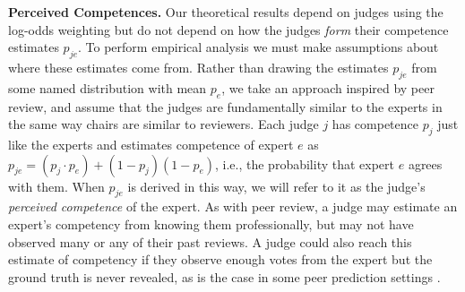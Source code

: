\documentclass[letterpaper]{article} %
\newcommand{\judge}{\ensuremath{j} }
\newcommand{\expert}{\ensuremath{e} }
\begin{document}
\smallskip
\noindent
\textbf{Perceived Competences.\;}%
Our theoretical results depend on judges using the log-odds weighting but do not depend on how the judges \emph{form} their competence estimates $p_{\judge \expert}$.
%
To perform empirical analysis we must make assumptions about where these estimates come from.
%
Rather than drawing the estimates $p_{\judge \expert}$ from some named distribution with mean $p_\expert$, we take an approach inspired by peer review, and assume that the judges are fundamentally similar to the experts in the same way chairs are similar to reviewers.
%
Each judge $j$ has competence $p_j$ just like the experts and estimates competence of expert $\expert$ as $p_{\judge \expert} = (p_\judge \cdot p_\expert) + (1 - p_\judge)(1 - p_\expert)$, i.e., the probability that expert $\expert$ agrees with them. 
%
When $p_{\judge \expert}$ is derived in this way, we will refer to it as the judge's \emph{perceived competence} of the expert.
%
As with peer review, a judge may estimate an expert's competency from knowing them professionally, but may not have observed many or any of their past reviews. A judge could also reach this estimate of competency if they observe enough votes from the expert but the ground truth is never revealed, as is the case in some peer prediction settings \cite{witkowski2012peer}.
 
\end{document}
